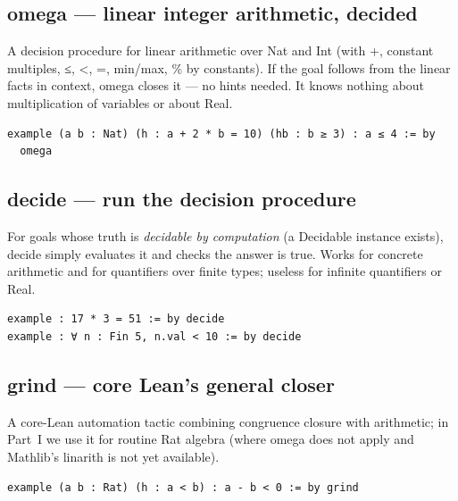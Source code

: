 \documentclass[12pt, openany]{book}
\theoremstyle{plain}
\theoremstyle{definition}
\theoremstyle{remark}
\newcommand{\li}[1]{{\ttfamily\small\color{tealaccent}#1}}
\begin{document}
\subsection*{\li{omega} --- linear integer arithmetic, decided}

A decision procedure for linear arithmetic over \li{Nat} and \li{Int} (with \li{+}, constant multiples, \li{≤}, \li{<}, \li{=}, \li{min}/\li{max}, \li{\%} by constants).  If the goal follows from the linear facts in context, \li{omega} closes it --- no hints needed.  It knows nothing about multiplication of variables or about \li{Real}.

\begin{leanbox}
\begin{lstlisting}
example (a b : Nat) (h : a + 2 * b = 10) (hb : b ≥ 3) : a ≤ 4 := by
  omega
\end{lstlisting}
\end{leanbox}
\color{black}

\subsection*{\li{decide} --- run the decision procedure}

For goals whose truth is \emph{decidable by computation} (a \li{Decidable} instance exists), \li{decide} simply evaluates it and checks the answer is \li{true}.  Works for concrete arithmetic and for quantifiers over finite types; useless for infinite quantifiers or \li{Real}.

\begin{leanbox}
\begin{lstlisting}
example : 17 * 3 = 51 := by decide
example : ∀ n : Fin 5, n.val < 10 := by decide
\end{lstlisting}
\end{leanbox}
\color{black}

\subsection*{\li{grind} --- core Lean's general closer}

A core-Lean automation tactic combining congruence closure with arithmetic; in Part~I we use it for routine \li{Rat} algebra (where \li{omega} does not apply and Mathlib's \li{linarith} is not yet available).

\begin{leanbox}
\begin{lstlisting}
example (a b : Rat) (h : a < b) : a - b < 0 := by grind
\end{lstlisting}
\end{leanbox}
\color{black}
\end{document}
